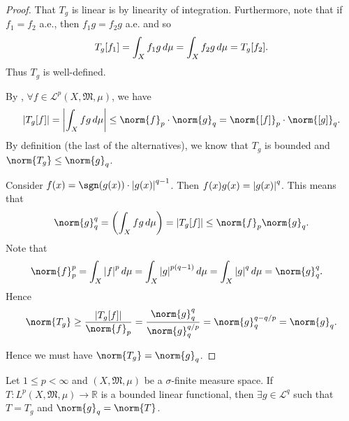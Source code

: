 \documentclass[notoc,notitlepage]{tufte-book}
\begin{document}
\begin{proof}
  That $T_g$ is linear is by linearity of integration.
  Furthermore, note that if $f_1 = f_2$ a.e., then $f_1 g = f_2 g$ a.e.
  and so
  \begin{equation*}
    T_g[f_1] = \int_X f_1 g \mathop{}\!d{\mu} = \int_X f_2 g \mathop{}\!d{\mu} = T_g[f_2].
  \end{equation*}
  Thus $T_g$ is well-defined.

  By ,
  $\forall f \in \mathcal{L}^p(X, \mathfrak{M}, \mu)$,
  we have
  \begin{equation*}
    \abs{T_g[f]} = \abs{\int_{X} f g \dif{\mu}} \leq \norm{f}_p \cdot \norm{g}_q
    = \norm{[f]}_p \cdot \norm{[g]}_q.
  \end{equation*}
  By definition (the last of the alternatives), we know that $T_g$ is bounded
  and $\norm{T_g} \leq \norm{g}_q$.

  Consider $f(x) = \sgn(g(x)) \cdot \abs{g(x)}^{q-1}$.
  Then $f(x) g(x) = \left|g(x)\right|^q$.
  This means that 
  \begin{equation*}
    \norm{g}_q^q = \left( \int_{X} fg \dif{\mu} \right) = \abs{T_g[f]}
    \leq \norm{f}_p \norm{g}_q.
  \end{equation*}
  Note that
  \begin{align*}
    \norm{f}_p^p &= \int_{X} \abs{f}^p \dif{\mu}
                = \int_{X} \abs{g}^{p(q-1)} \dif{\mu}
                = \int_{X} \abs{g}^q \dif{\mu} = \norm{g}_q^q.
  \end{align*}
  Hence
  \begin{equation*}
    \norm{T_g} \geq \frac{\abs{T_g[f]}}{\norm{f}_p}
               = \frac{\norm{g}_q^q}{\norm{g}_q^{q / p}}
               = \norm{g}_q^{q - q / p} = \norm{g}_q.
  \end{equation*}

  Hence we must have $\norm{T_g} = \norm{g}_q$.
\end{proof}

\begin{thm}\label{thm:riesz_representation_theorem}
  Let $1 \leq p < \infty$
  and $(X, \mathfrak{M}, \mu)$ be a $\sigma$-finite measure space.
  If $T : L^p(X, \mathfrak{M}, \mu) \to \mathbb{R}$ is a bounded linear functional,
  then $\exists g \in \mathcal{L}^q$ such that
  $T = T_g$ and $\norm{g}_q = \norm{T}$.
\end{thm}
\end{document}
